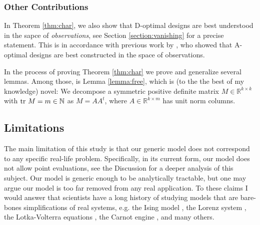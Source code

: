 \subsubsection{Other Contributions}
In Theorem \ref{thm:char}, we also show that D-optimal designs are
best understood in the sapce of \emph{observations}, see Section
\ref{section:vanishing} for a precise statement. This is in accordance
with previous work by \cite{koval2020}, who showed that A-optimal
designs are best constructed in the space of observations.

In the process of proving Theorem \ref{thm:char} we prove and
generalize several lemmas. Among those, is Lemma \ref{lemma:free},
which is (to the the best of my knowledge) novel: We decompose a
symmetric positive definite matrix \(M \in \mathbb{R}^{k \times k}\)
with \(\textup{tr}\ M = m \in \mathbb{N}\) as \(M = AA^t\), where \(A\in
\mathbb{R}^{k \times m}\) has unit norm columns.




\subsection{Limitations}\label{subsec:limitations}
The main limitation of this study is that our generic model does not
correspond to any specific real-life problem. Specifically, in its
current form, our model does not allow point evaluations, see the
Discussion for a deeper analysis of this subject. Our model is generic
enough to be analytically tractable, but one may argue our model is
too far removed from any real application. To these claims I would
answer that scientists have a long history of studying models that are
bare-bones simplifications of real systems, e.g. the Ising model
\cite{cipra1987}, the Lorenz system \cite{brin}, the Lotka-Volterra
equations \cite{logan2006}, the Carnot engine \cite{kardar2007}, and
many others.
